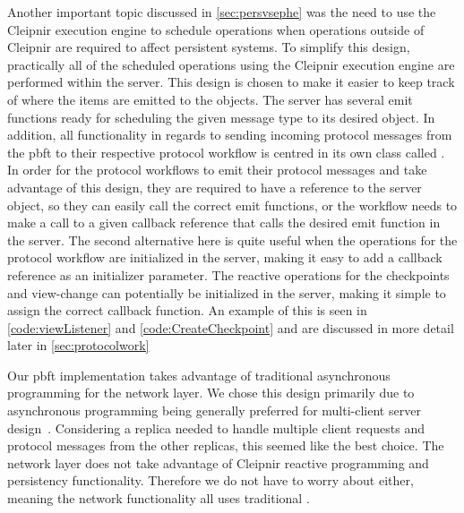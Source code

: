 Another important topic discussed in \autoref{sec:persvsephe} was the need to use the Cleipnir execution engine to schedule operations when operations outside of Cleipnir are required to affect persistent systems. To simplify this design, practically all of the scheduled operations using the Cleipnir execution engine are performed within the server. This design is chosen to make it easier to keep track of where the items are emitted to the  objects. The server has several emit functions ready for scheduling the given message type to its desired  object. In addition, all functionality in regards to sending incoming protocol messages from the \ac{pbft} to their respective protocol workflow is centred in its own class called . In order for the protocol workflows to emit their protocol messages and take advantage of this design, they are required to have a reference to the server object, so they can easily call the correct emit functions, or the workflow needs to make a call to a given callback reference that calls the desired emit function in the server. The second alternative here is quite useful when the operations for the protocol workflow are initialized in the server, making it easy to add a callback reference as an initializer parameter. The reactive operations for the checkpoints and view-change can potentially be initialized in the server, making it simple to assign the correct callback function. An example of this is seen in \autoref{code:viewListener} and \autoref{code:CreateCheckpoint} and are discussed in more detail later in \autoref{sec:protocolwork}

Our \ac{pbft} implementation takes advantage of traditional asynchronous programming for the network layer. We chose this design primarily due to asynchronous programming being generally preferred for multi-client server design~\cite{VIDEO:AsyncConBack, DOC:AsyncAwait}. Considering a replica needed to handle multiple client requests and protocol messages from the other replicas, this seemed like the best choice. The network layer does not take advantage of Cleipnir reactive programming and persistency functionality. Therefore we do not have to worry about  either, meaning the network functionality all uses traditional .
\fi

\iffalse

